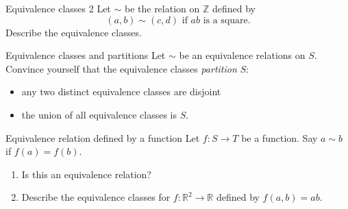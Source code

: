 \documentclass[t, 10pt]{beamer}
\renewcommand{\mathbf}{\mathbb}
\begin{document}
\begin{frame}[label={sec:org4a9ba7b}]{Equivalence classes 2}
Let \(\sim\) be the relation on \(\mathbf{Z}\) defined by
\[ (a,b) \sim (c,d) \text{ if } ab \text{ is a square}.\]
Describe the equivalence classes.
\end{frame}
\begin{frame}[label={sec:orgecc12de}]{Equivalence classes and partitions}
Let \(\sim\) be an equivalence relations on \(S\).
Convince yourself that the equivalence classes \emph{partition} \(S\):
\begin{itemize}
\item any two distinct equivalence classes are disjoint
\item the union of all equivalence classes is \(S\).
\end{itemize}
\end{frame}
\begin{frame}[label={sec:orgf78bf42}]{Equivalence relation defined by a function}
Let \(f \colon S \to T\) be a function.
Say \(a \sim b\) if \(f(a) = f(b)\).
\begin{enumerate}
\item Is this an equivalence relation?
\item Describe the equivalence classes for \(f \colon \mathbf{R}^2 \to \mathbf{R}\) defined by \(f(a,b) = ab\).
\end{enumerate}
\end{frame}
\end{document}
